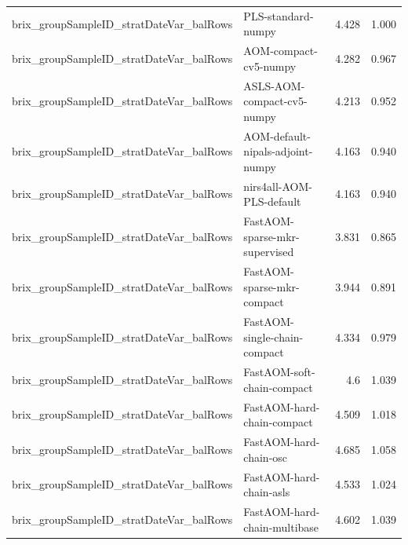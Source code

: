 \begin{landscape}
\begin{longtable}{L{8.0cm}L{9.5cm}rr}
brix\_\allowbreak{}groupSampleID\_\allowbreak{}stratDateVar\_\allowbreak{}balRows & PLS-\allowbreak{}standard-\allowbreak{}numpy & 4.428 & 1.000 \\
brix\_\allowbreak{}groupSampleID\_\allowbreak{}stratDateVar\_\allowbreak{}balRows & AOM-\allowbreak{}compact-\allowbreak{}cv5-\allowbreak{}numpy & 4.282 & 0.967 \\
brix\_\allowbreak{}groupSampleID\_\allowbreak{}stratDateVar\_\allowbreak{}balRows & ASLS-\allowbreak{}AOM-\allowbreak{}compact-\allowbreak{}cv5-\allowbreak{}numpy & 4.213 & 0.952 \\
brix\_\allowbreak{}groupSampleID\_\allowbreak{}stratDateVar\_\allowbreak{}balRows & AOM-\allowbreak{}default-\allowbreak{}nipals-\allowbreak{}adjoint-\allowbreak{}numpy & 4.163 & 0.940 \\
brix\_\allowbreak{}groupSampleID\_\allowbreak{}stratDateVar\_\allowbreak{}balRows & nirs4all-\allowbreak{}AOM-\allowbreak{}PLS-\allowbreak{}default & 4.163 & 0.940 \\
brix\_\allowbreak{}groupSampleID\_\allowbreak{}stratDateVar\_\allowbreak{}balRows & FastAOM-\allowbreak{}sparse-\allowbreak{}mkr-\allowbreak{}supervised & 3.831 & 0.865 \\
brix\_\allowbreak{}groupSampleID\_\allowbreak{}stratDateVar\_\allowbreak{}balRows & FastAOM-\allowbreak{}sparse-\allowbreak{}mkr-\allowbreak{}compact & 3.944 & 0.891 \\
brix\_\allowbreak{}groupSampleID\_\allowbreak{}stratDateVar\_\allowbreak{}balRows & FastAOM-\allowbreak{}single-\allowbreak{}chain-\allowbreak{}compact & 4.334 & 0.979 \\
brix\_\allowbreak{}groupSampleID\_\allowbreak{}stratDateVar\_\allowbreak{}balRows & FastAOM-\allowbreak{}soft-\allowbreak{}chain-\allowbreak{}compact & 4.6 & 1.039 \\
brix\_\allowbreak{}groupSampleID\_\allowbreak{}stratDateVar\_\allowbreak{}balRows & FastAOM-\allowbreak{}hard-\allowbreak{}chain-\allowbreak{}compact & 4.509 & 1.018 \\
brix\_\allowbreak{}groupSampleID\_\allowbreak{}stratDateVar\_\allowbreak{}balRows & FastAOM-\allowbreak{}hard-\allowbreak{}chain-\allowbreak{}osc & 4.685 & 1.058 \\
brix\_\allowbreak{}groupSampleID\_\allowbreak{}stratDateVar\_\allowbreak{}balRows & FastAOM-\allowbreak{}hard-\allowbreak{}chain-\allowbreak{}asls & 4.533 & 1.024 \\
brix\_\allowbreak{}groupSampleID\_\allowbreak{}stratDateVar\_\allowbreak{}balRows & FastAOM-\allowbreak{}hard-\allowbreak{}chain-\allowbreak{}multibase & 4.602 & 1.039 \\

\end{longtable}
\end{landscape}
